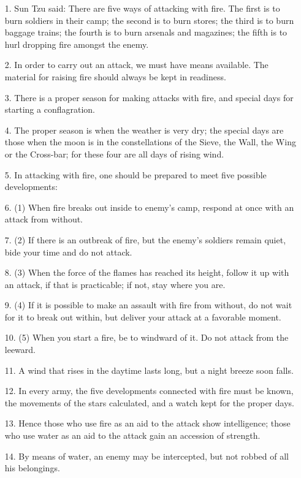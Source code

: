 \documentclass[11pt,openany]{memoir}
\newcommand{\enumeratemargin}{1.30em}
\begin{document}
\begin{enumerate}[leftmargin=\enumeratemargin]
\item[1.] Sun Tzu said: There are five ways of attacking with fire. The first is to burn soldiers in their camp; the second is to burn stores; the third is to burn baggage trains; the fourth is to burn arsenals and magazines; the fifth is to hurl dropping fire amongst the enemy.
\item[2.] In order to carry out an attack, we must have means available. The material for raising fire should always be kept in readiness.
\item[3.] There is a proper season for making attacks with fire, and special days for starting a conflagration.
\item[4.] The proper season is when the weather is very dry; the special days are those when the moon is in the constellations of the Sieve, the Wall, the Wing or the Cross-bar; for these four are all days of rising wind.
\item[5.] In attacking with fire, one should be prepared to meet five possible developments:
\item[6.] (1) When fire breaks out inside to enemy's camp, respond at once with an attack from without.
\item[7.] (2) If there is an outbreak of fire, but the enemy's soldiers remain quiet, bide your time and do not attack.
\item[8.] (3) When the force of the flames has reached its height, follow it up with an attack, if that is practicable; if not, stay where you are.
\item[9.] (4) If it is possible to make an assault with fire from without, do not wait for it to break out within, but deliver your attack at a favorable moment.
\item[10.] (5) When you start a fire, be to windward of it. Do not attack from the leeward.
\item[11.] A wind that rises in the daytime lasts long, but a night breeze soon falls.
\item[12.] In every army, the five developments connected with fire must be known, the movements of the stars calculated, and a watch kept for the proper days.
\item[13.] Hence those who use fire as an aid to the attack show intelligence; those who use water as an aid to the attack gain an accession of strength.
\item[14.] By means of water, an enemy may be intercepted, but not robbed of all his belongings.

\end{enumerate}
\end{document}
